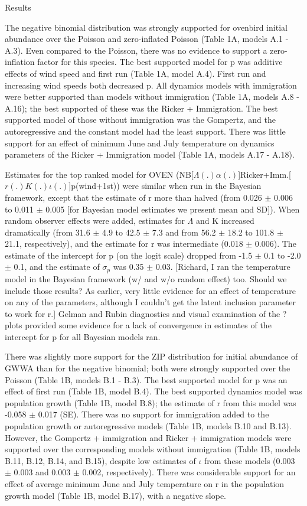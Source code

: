 \documentclass{article}
\begin{document}
Results

The negative binomial distribution was strongly supported for ovenbird
initial abundance over the Poisson and zero-inflated Poisson (Table
1A, models A.1 - A.3).  Even compared to the Poisson, there was no
evidence to support a zero-inflation factor for this species.  The
best supported model for p was additive effects of wind speed and
first run (Table 1A, model A.4).  First run and increasing wind speeds
both decreased p.  All dynamics models with immigration were better
supported than models without immigration (Table 1A, models A.8 -
A.16); the best supported of these was the Ricker + Immigration.  The
best supported model of those without immigration was the Gompertz,
and the autoregressive and the constant model had the least support.
There was little support for an effect of minimum June and July
temperature on dynamics parameters of the Ricker + Immigration model
(Table 1A, models A.17 - A.18).

Estimates for the top ranked model for OVEN
(NB[$\Lambda (.) \alpha (.)$]Ricker+Imm.[$r(.)K(.) \iota (.)$]p(wind+1st)) were similar when
run in the Bayesian framework, except that the estimate of r more than
halved (from 0.026 $\pm$ 0.006 to 0.011 $\pm$ 0.005 [for Bayesian model
estimates we present mean and SD]).  When random observer effects were
added, estimates for $\Lambda$ and K increased dramatically (from 31.6 $\pm$ 4.9
to 42.5 $\pm$ 7.3 and from 56.2 $\pm$ 18.2 to 101.8 $\pm$ 21.1, respectively), and
the estimate for r was intermediate (0.018 $\pm$ 0.006).  The estimate of
the intercept for p (on the logit scale) dropped from -1.5 $\pm$ 0.1 to
-2.0 $\pm$ 0.1, and the estimate of $\sigma_p$ was 0.35 $\pm$ 0.03.  [Richard, I ran
the temperature model in the Bayesian framework (w/ and w/o random
effect) too.  Should we include those results?  As earlier, very
little evidence for an effect of temperature on any of the parameters,
although I couldn't get the latent inclusion parameter to work for r.]
Gelman and Rubin diagnostics and visual examination of the ? plots
provided some evidence for a lack of convergence in estimates of the
intercept for p for all Bayesian models ran.

There was slightly more support for the ZIP distribution for initial
abundance of GWWA than for the negative binomial; both were strongly
supported over the Poisson (Table 1B, models B.1 - B.3).  The best
supported model for p was an effect of first run (Table 1B, model
B.4).  The best supported dynamics model was population growth (Table
1B, model B.8); the estimate of r from this model was -0.058 $\pm$ 0.017
(SE).  There was no support for immigration added to the population
growth or autoregressive models (Table 1B, models B.10 and B.13).
However, the Gompertz + immigration and Ricker + immigration models
were supported over the corresponding models without immigration
(Table 1B, models B.11, B.12, B.14, and B.15), despite low estimates
of $\iota$ from these models (0.003 $\pm$ 0.003 and 0.003 $\pm$ 0.002,
respectively).  There was considerable support for an effect of
average minimum June and July temperature on r in the population
growth model (Table 1B, model B.17), with a negative slope.
\end{document}
